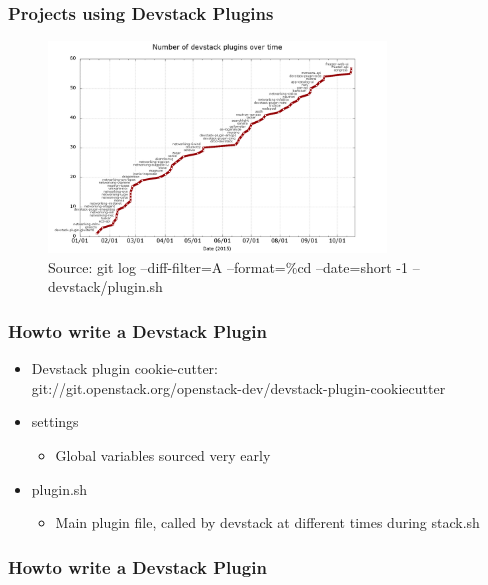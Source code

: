 \documentclass[aspectratio=169,11pt,hyperref={colorlinks=true}]{beamer}
\begin{document}
\begin{frame}
    \frametitle{Projects using Devstack Plugins}
    \begin{figure}[p]
    	\centering
    	\includegraphics[width=0.8\textwidth]{devstack-plugins.png}
    	\caption{Source: git log --diff-filter=A --format=\%cd --date=short -1 -- devstack/plugin.sh}
    \end{figure}
\end{frame}

\begin{frame}
    \frametitle{Howto write a Devstack Plugin}
    \begin{itemize}
    	\item Devstack plugin cookie-cutter: \hfill
    	\\ git://git.openstack.org/openstack-dev/devstack-plugin-cookiecutter
    \end{itemize}

    \begin{itemize}
        \item settings
        \begin{itemize}
            \item Global variables sourced very early 
        \end{itemize}
        \item plugin.sh
        \begin{itemize}
            \item Main plugin file, called by devstack at different times during stack.sh
        \end{itemize}
    \end{itemize}
\end{frame}

\begin{frame}
    \frametitle{Howto write a Devstack Plugin}
        
\end{frame}
\end{document}
